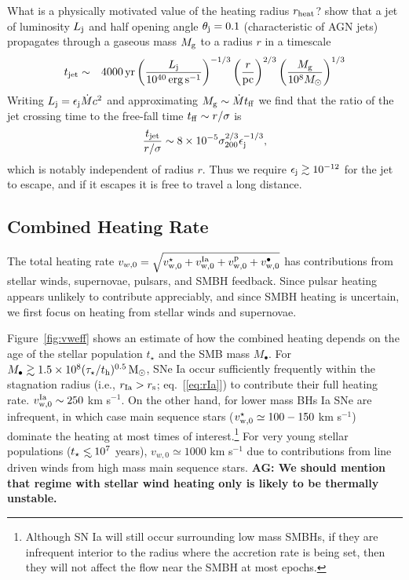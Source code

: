 \documentclass[usenatbib,fleqn]{mn2e}
\newcommand\lsim{\mathrel{\rlap{\lower4pt\hbox{\hskip1pt$\sim$}}
    \raise1pt\hbox{$<$}}}
\newcommand{\Mbh}[1][]{M_{\bullet#1}}
\newcommand{\vwO}{v_{w,0}}
\newcommand{\tage}{t_{\star}}
\begin{document}
What is a physically motivated value of the heating radius $r_{\rm
  heat}$?  \citet{Bromberg+11} show that a jet of luminosity $L_{\rm
  j}$ and half opening angle $\theta_{\rm j} = 0.1$ (characteristic of
AGN jets) propagates through a gaseous mass $M_{\rm g}$ to a radius
$r$ in a timescale
\begin{eqnarray}
t_{\rm jet} &\sim& 4000\,{\rm yr}\left(\frac{{L}_{\rm j}}{10^{40}\,\rm erg\,s^{-1}}\right)^{-1/3}\left(\frac{r}{\rm pc}\right)^{2/3}\left(\frac{M_{\rm g}}{10^{8}M_{\odot}}\right)^{1/3} 
\end{eqnarray}
Writing $L_{\rm j} = \epsilon_{\rm j}\dot{M}c^{2}$ and approximating $M_{\rm g} \sim \dot{M}t_{\rm ff}$ we find that the ratio of the jet crossing time to the free-fall time $t_{\rm ff} \sim r/\sigma$ is 
\begin{equation}
\frac{t_{\rm jet}}{r/\sigma} \sim 8\times 10^{-5}\sigma_{200}^{2/3}\epsilon_{\rm j}^{-1/3},
\end{equation}
which is notably independent of radius $r$.  Thus we require $\epsilon_{\rm j} \gtrsim 10^{-12}$ for the jet to escape, and if it escapes it is free to travel a long distance. 

\subsection{Combined Heating Rate} 

The total heating rate $\vwO = \sqrt{v_{\rm w,0}^{\star} + v_{\rm w,0}^{\rm Ia} + v_{\rm w,0}^{\rm p} + v_{\rm w,0}^{\bullet}}$ has contributions from stellar winds, supernovae, pulsars, and SMBH feedback.  Since pulsar heating appears unlikely to contribute appreciably, and since SMBH heating is uncertain, we first focus on heating from stellar winds and supernovae.  

Figure~\ref{fig:vweff} shows an estimate of how the combined heating
depends on the age of the stellar population $\tage$ and the SMB mass
$\Mbh$.  For $M_{\bullet} \gtrsim 1.5\times 10^8 (\tau_{\star}/t_{\rm
  h})^{0.5} \,{\rm M_\odot}$, SNe Ia occur sufficiently frequently within the
stagnation radius (i.e., $r_{\rm Ia} > r_{\rm s}$; eq.~[\ref{eq:rIa}])
to contribute their full heating rate.  $v_{\rm w,0}^{\rm Ia} \sim
250$ km s$^{-1}$.  On the other hand, for lower mass BHs Ia SNe are
infrequent, in which case main sequence stars ($v_{\rm w,0}^{\star}
\simeq 100-150$ km s$^{-1}$) dominate the heating at most times of
interest.\footnote{Although SN Ia will still occur surrounding low
  mass SMBHs, if they are infrequent interior to the radius where the
  accretion rate is being set, then they will not affect the flow near
  the SMBH at most epochs.}  For very young stellar populations
($\tage \lsim 10^7$ years), $\vwO\simeq 1000$ km s$^{-1}$ due to
contributions from line driven winds from high mass main sequence
stars.
{\bf AG: We should mention that regime with stellar wind heating only
  is likely to be thermally unstable.}
\end{document}
